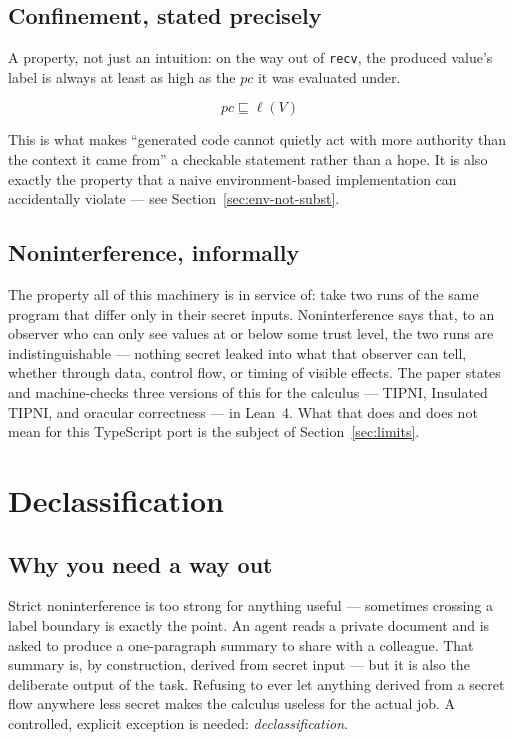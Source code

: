 \documentclass[11pt, a4paper]{article}
\newcommand{\flowsto}{\sqsubseteq}
\begin{document}
\begin{descirption}
{\subsection{Confinement, stated precisely}

A property, not just an intuition: on the way out of \lstinline{recv},
the produced value's label is always at least as high as the $pc$ it was
evaluated under.

\[
pc \flowsto \ell(V)
\]

This is what makes ``generated code cannot quietly act with more
authority than the context it came from'' a checkable statement rather
than a hope. It is also exactly the property that a naive
environment-based implementation can accidentally violate --- see
Section~\ref{sec:env-not-subst}.

\subsection{Noninterference, informally}

The property all of this machinery is in service of: take two runs of the
same program that differ only in their secret inputs. Noninterference
says that, to an observer who can only see values at or below some trust
level, the two runs are indistinguishable --- nothing secret leaked into
what that observer can tell, whether through data, control flow, or
timing of visible effects. The paper states and machine-checks three
versions of this for the calculus --- TIPNI, Insulated TIPNI, and
oracular correctness --- in Lean~4. What that does and does not mean for
this TypeScript port is the subject of Section~\ref{sec:limits}.

\section{Declassification}

\subsection{Why you need a way out}
\label{sec:failures}

Strict noninterference is too strong for anything useful --- sometimes
crossing a label boundary is exactly the point. An agent reads a private
document and is asked to produce a one-paragraph summary to share with a
colleague. That summary is, by construction, derived from secret input
--- but it is also the deliberate output of the task. Refusing to ever let
anything derived from a secret flow anywhere less secret makes the
calculus useless for the actual job. A controlled, explicit exception is
needed: \emph{declassification}.

}
\end{descirption}
\end{document}
